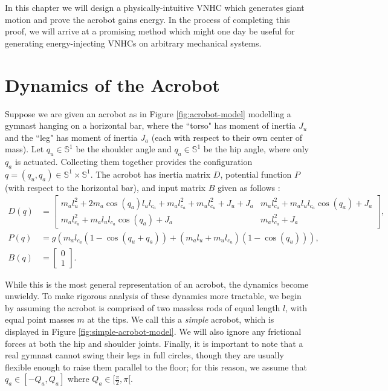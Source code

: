 In this chapter we will design a physically-intuitive VNHC which generates giant
motion and prove the acrobot gains energy. 
In the process of completing this proof, we will arrive at a promising method
which might one day be useful for generating energy-injecting VNHCs on arbitrary
mechanical systems.

\section{Dynamics of the Acrobot}
Suppose we are given an acrobot as in Figure \ref{fig:acrobot-model} modelling a
gymnast hanging on a horizontal bar, where the ``torso" has moment of
inertia \(J_u\) and the ``leg" has moment of inertia \(J_a\) (each with respect
to their own center of mass).
Let \(q_u \in \mathbb{S}^1\) be the shoulder angle and \(q_a \in \mathbb{S}^1\) 
be the hip angle, where only \(q_a\) is actuated. 
Collecting them together provides the configuration
\(q = (q_u,q_a) \in \mathbb{S}^1 \times \mathbb{S}^1\). 
The acrobot has inertia matrix \(D\), potential function \(P\) (with respect to
the horizontal bar), and input matrix \(B\)  given as
follows \cite{xingbo_thesis}:
\begin{align}\label{eqn:general-acrobot-inertia}
    D(q) &= \begin{bmatrix}
      m_al_u^2 + 2m_a\cos(q_a)l_u l_{c_a} + m_al_{c_a}^2 + m_ul_{c_u}^2 + J_u + J_a &
      m_al_{c_a}^2 + m_al_ul_{c_a}\cos(q_a) + J_a \\
      m_al_{c_a}^2 + m_al_ul_{c_a}\cos(q_a) + J_a &
      m_al_{c_a}^2 + J_a
    \end{bmatrix} 
    , \\
    \label{eqn:general-acrobot-potential}
    P(q) &= g\left(m_al_{c_a}(1 - \cos(q_u+q_a)) + 
        (m_al_u + m_ul_{c_u})(1-\cos(q_u))\right) 
    , \\
    B(q) &= \begin{bmatrix} 0 \\ 1 \end{bmatrix}
    .
\end{align}

While this is the most general representation of an acrobot, the dynamics
become unwieldy.
To make rigorous analysis of these dynamics more tractable, we begin by assuming
the acrobot is comprised of two massless rods of equal length \(l\), with equal
point masses \(m\) at the tips.
We call this a \textit{simple} acrobot, which is displayed in Figure
\ref{fig:simple-acrobot-model}.
We will also ignore any frictional forces at both the hip and shoulder joints. 
Finally, it is important to note that a real gymnast cannot swing their legs in
full circles, though they are usually flexible enough to raise them parallel to
the floor; 
for this reason, we assume that \(q_a \in [-Q_a, Q_a]\) where 
\(Q_a \in [\frac{\pi}{2}, \pi[\). 

